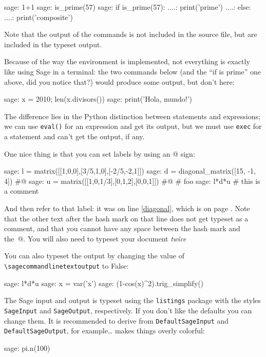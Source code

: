 \documentclass{article}
\begin{document}
\begin{sagecommandline}
  sage: 1+1
  sage: is_prime(57)
  sage: if is_prime(57):
  ....:     print('prime')
  ....: else:
  ....:     print('composite')
\end{sagecommandline}

Note that the output of the commands is not included in the source file,
but are included in the typeset output.

Because of the way the environment is implemented, not everything is
exactly like using Sage in a terminal: the two commands below (and the
``if is prime'' one above, did you notice that?) would produce some
output, but don't here:

\begin{sagecommandline}
  sage: x = 2010; len(x.divisors())
  sage: print('Hola, mundo!')
\end{sagecommandline}

The difference lies in the Python distinction between statements and
expressions; we can use \texttt{eval()} for an expression and get its
output, but we must use \texttt{exec} for a statement and can't get the
output, if any.

One nice thing is that you can set labels by using an @ sign:

\begin{sagecommandline}
  sage: l = matrix([[1,0,0],[3/5,1,0],[-2/5,-2,1]])
  sage: d = diagonal_matrix([15, -1, 4]) #@\label{diagonal}
  sage: u = matrix([[1,0,1/3],[0,1,2],[0,0,1]]) #@\label{anotherlabel} \# foo
  sage: l*d*u   # this is a comment
\end{sagecommandline}

And then refer to that label: it was on line \ref{diagonal}, which is on
page \pageref{diagonal}. Note that the other text after the hash mark on
that line does not get typeset as a comment, and that you cannot have
any space between the hash mark and the~@. You will also need to typeset
your document \emph{twice}

You can also typeset the output by changing the value of
\verb|\sagecommandlinetextoutput| to False:
\renewcommand{\sagecommandlinetextoutput}{False}
\begin{sagecommandline}
  sage: l*d*u
  sage: x = var('x')
  sage: (1-cos(x)^2).trig_simplify()
\end{sagecommandline}

\renewcommand{\sagecommandlinetextoutput}{True}

The Sage input and output is typeset using the \texttt{listings} package
with the styles \texttt{SageInput} and \texttt{SageOutput},
respectively. If you don't like the defaults you can change them. It is
recommended to derive from \texttt{DefaultSageInput} and
\texttt{DefaultSageOutput}, for example\ldots
{}
makes things overly colorful:
\begin{sagecommandline}
  sage: pi.n(100)
\end{sagecommandline}
\end{document}
